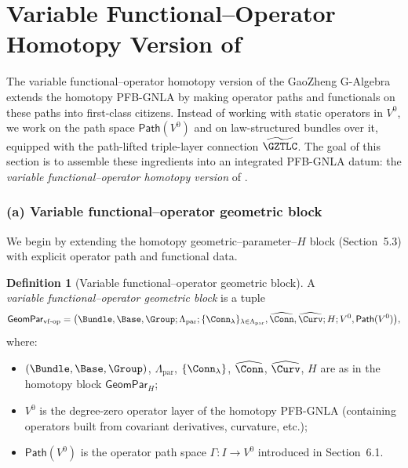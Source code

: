 \documentclass[11pt]{book}
\theoremstyle{plain}
\theoremstyle{definition}
\newtheorem{definition}[theorem]{Definition} \theoremstyle{remark}
\begin{document}
\section[Variable Functional--Operator Homotopy Version of the G-Algebra]{Variable Functional--Operator Homotopy Version of \\ \GAlgebra}


The variable functional--operator homotopy version of the GaoZheng
G-Algebra extends the homotopy PFB-GNLA by making operator paths and
functionals on these paths into first-class citizens. Instead of
working with static operators in $V^0$, we work on the path space
$\mathsf{Path}(V^0)$ and on law-structured bundles over it, equipped
with the path-lifted triple-layer connection $\widetilde{\GZTLC}$. The
goal of this section is to assemble these ingredients into an
integrated PFB-GNLA datum: the \emph{variable functional--operator
homotopy version} of \GAlgebra.



\subsubsection*{(a) Variable functional--operator geometric block}

We begin by extending the homotopy geometric--parameter--$H$ block
(Section~5.3) with explicit operator path and functional data.

\begin{definition}[Variable functional--operator geometric block]
A \\ \emph{variable functional--operator geometric block} is a tuple
  \[
     \mathsf{GeomPar}_{\mathrm{vf\text- op}}
     =
     \bigl(
       \Bundle,\Base,\Group;
       \Lambda_{\mathrm{par}};
       \{\Conn_\lambda\}_{\lambda\in\Lambda_{\mathrm{par}}},
       \widehat{\Conn},\widehat{\Curv};
       H;
       V^0,\mathsf{Path}(V^0)
     \bigr),
  \]
  where:
  \begin{itemize}
    \item $(\Bundle,\Base,\Group)$,
          $\Lambda_{\mathrm{par}}$,
          $\{\Conn_\lambda\}$,
          $\widehat{\Conn}$,
          $\widehat{\Curv}$,
          $H$ are as in the homotopy block $\mathsf{GeomPar}_H$;
    \item $V^0$ is the degree-zero operator layer of the homotopy
          PFB-GNLA (containing operators built from covariant
          derivatives, curvature, etc.);
    \item $\mathsf{Path}(V^0)$ is the operator path space
          $\Gamma:I\to V^0$ introduced in Section~6.1.
  \end{itemize}
\end{definition}
\end{document}
